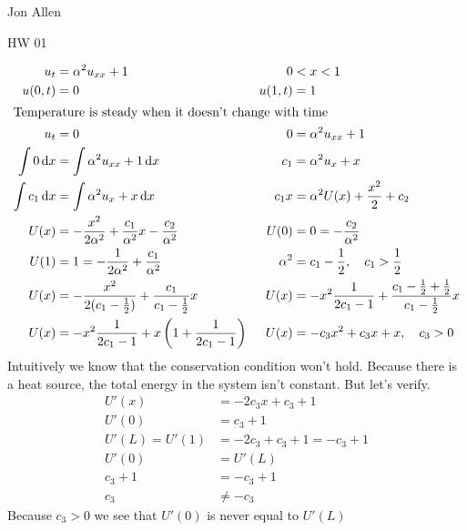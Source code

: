 \documentclass{article}
\begin{document}
Jon Allen

HW 01

\begin{align*}
  u_t &= \alpha^2 u_{xx}+1 & 0 &< x < 1\\
  u(0,t) &= 0 &
  u(1,t) &= 1\\
  \intertext{Temperature is steady when it doesn't change with time}
  u_t &= 0 & 0 &= \alpha^2 u_{xx}+1\\
  \int{0\,\mathrm{d}x}&=\int{\alpha^2 u_{xx}+1\,\mathrm{d}x} &
  c_1 &= \alpha^2 u_x+x\\
  \int{c_1\,\mathrm{d}x}&=\int{\alpha^2 u_x+x\,\mathrm{d}x} &
  c_1x&=\alpha^2 U(x)+\frac{x^2}{2}+c_2\\
  U(x) &=-\frac{x^2}{2\alpha^2}+\frac{c_1}{\alpha^2}x-\frac{c_2}{\alpha^2} &
  U(0)&=0=-\frac{c_2}{\alpha^2}\\
  U(1)&=1=-\frac{1}{2\alpha^2}+\frac{c_1}{\alpha^2} &
  \alpha^2&=c_1-\frac{1}{2},\quad c_1>\frac{1}{2}\\
  U(x)&=-\frac{x^2}{2(c_1-\frac{1}{2})}+\frac{c_1}{c_1-\frac{1}{2}}x &
  U(x)&=-x^2\frac{1}{2c_1-1}+\frac{c_1-\frac{1}{2}+\frac{1}{2}}{c_1-\frac{1}{2}}x\\
  U(x)&=-x^2\frac{1}{2c_1-1}+x\left(1+\frac{1}{2c_1-1}\right) &
  U(x)&=-c_3x^2+c_3x+x,\quad c_3>0
\end{align*}
Intuitively we know that the conservation condition won't hold. Because there is a heat source, the total energy in the system isn't constant. But let's verify.
\begin{align*}
  U'(x)&=-2c_3x+c_3+1\\
  U'(0)&=c_3+1\\
  U'(L)=U'(1)&=-2c_3+c_3+1=-c_3+1\\
  U'(0)&=U'(L)\\
  c_3+1&=-c_3+1\\
  c_3&\neq-c_3
\end{align*}
Because $c_3>0$ we see that $U'(0)$ is never equal to $U'(L)$
\end{document}
